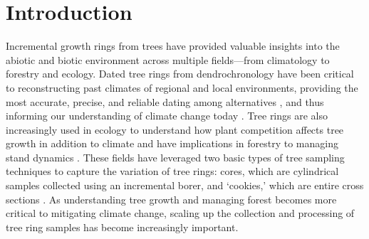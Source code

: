 \documentclass[a4paper,12pt]{article}
\begin{document}
\begin{abstract}
4. TIM provides a new method to gather high quality tree ring images at larger sizes and dimensions, integrating higher scanning resolution, tree cookie sampling, and batch digitization in a single low-cost package. 
Designed as completely open-source, we hope TIM will facilitate the widespread sampling of tree rings across diverse ecosystems and reduce barriers for researchers with smaller budgets. 

\end{abstract}

\section{Introduction} 
Incremental growth rings from trees have provided valuable insights into the abiotic and biotic environment across multiple fields---from climatology to forestry and ecology. Dated tree rings from dendrochronology have been critical to
reconstructing past climates of regional and local environments, providing the most accurate, precise, and reliable dating among alternatives \citep{mann_northern_1999}, and thus informing  our understanding of climate change today \citep{fritts_dendroclimatology_1971,williams_using_2010,guibal_dendrochronology_2021,sheppard_dendroclimatology_2010,williams_large_2020}. Tree rings are also increasingly used in ecology to understand how plant competition affects tree growth in addition to climate \citep{buechling_climate_2017} and have implications in forestry to managing stand dynamics \citep{canham_neighborhood_2004}. These fields have leveraged two basic types of tree sampling techniques to capture the variation of tree rings: cores, which are cylindrical samples collected using an incremental borer, and `cookies,' which are entire cross sections \citep[and thus allow measuring as many radii from the sample as desired,][]{speer_fundamentals_2010}. As understanding tree growth and managing forest becomes more critical to mitigating climate change, scaling up the collection and processing of tree ring samples has become increasingly important.
\end{document}
